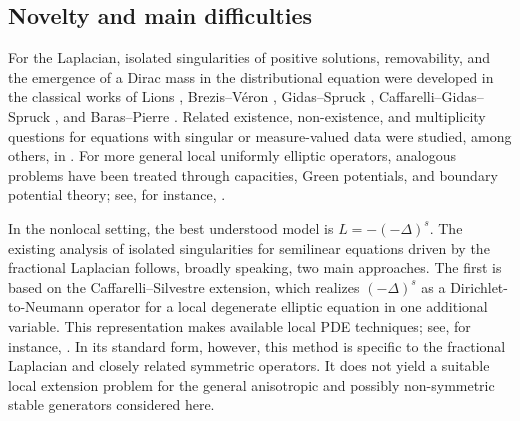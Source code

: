 \documentclass[11pt,a4paper,reqno]{amsart}
\theoremstyle{definition}
\numberwithin{equation}{section}
\begin{document}
\subsection{Novelty and main difficulties}
\label{subsec-main-difficulties}

For the Laplacian, isolated singularities of positive solutions, removability, and the emergence of a 
Dirac mass in the distributional equation were developed in the classical works of Lions \cite{lit:Lions1980}, 
Brezis--V\'eron \cite{lit:BrezisVeron1980}, Gidas--Spruck \cite{lit:GidasSpruck1981}, 
Caffarelli--Gidas--Spruck \cite{lit:CaffarelliGidasSpruck1989}, 
and Baras--Pierre \cite{lit:BarasPierre1984}. Related existence, non-existence, and multiplicity questions for equations 
with singular or measure-valued data were studied, among others, in \cite{lit:AmannQuittner1998,lit:FerreroSaccon2006,lit:NaitoSato2007}. 
For more general local uniformly elliptic operators, analogous problems have been treated through capacities, 
Green potentials, and boundary potential theory; see, for instance, \cite{lit:HirataOno2014,lit:Veron1996,lit:MarcusVeron2014}.

In the nonlocal setting,  the best understood  model is $L=-(-\Delta)^s$. 
The existing analysis of isolated singularities for semilinear equations
driven by the fractional Laplacian follows, broadly speaking, two main
approaches. The first is based on the Caffarelli--Silvestre extension, which
realizes $(-\Delta)^s$ as a Dirichlet-to-Neumann operator for a local
degenerate elliptic equation in one additional variable. This representation
makes available local PDE techniques; see, for
instance,
\cite{lit:CaffarelliJinSireXiong2014,lit:DeLaTorreGonzalez2018,
lit:YangZou2021}.
In its standard form, however, this method is specific to the fractional
Laplacian and closely related symmetric operators. It does not yield a
suitable local extension problem for the general anisotropic and possibly
non-symmetric stable generators considered here.
\end{document}
